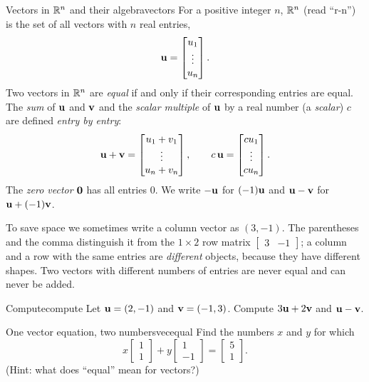 \documentclass[11pt]{article}
\begin{document}
\begin{defn}{Vectors in $\mathbb{R}^n$ and their algebra}{vectors}
For a positive integer $n$, $\mathbb{R}^n$ (read ``r-n'') is the set of all vectors with $n$ real entries,
\[
\mathbf{u}=\begin{bmatrix}u_1\\ \vdots\\ u_n\end{bmatrix}.
\]
Two vectors in $\mathbb{R}^n$ are \emph{equal} if and only if their corresponding entries are equal. The \emph{sum} of
$\mathbf{u}$ and $\mathbf{v}$ and the \emph{scalar multiple} of $\mathbf{u}$ by a real number (a \emph{scalar}) $c$ are defined
\emph{entry by entry}:
\[
\mathbf{u}+\mathbf{v}=\begin{bmatrix}u_1+v_1\\ \vdots\\ u_n+v_n\end{bmatrix},\qquad
c\,\mathbf{u}=\begin{bmatrix}cu_1\\ \vdots\\ cu_n\end{bmatrix}.
\]
The \emph{zero vector} $\mathbf{0}$ has all entries $0$. We write $-\mathbf{u}$ for $(-1)\mathbf{u}$ and
$\mathbf{u}-\mathbf{v}$ for $\mathbf{u}+(-1)\mathbf{v}$.
\end{defn}

To save space we sometimes write a column vector as $(3,-1)$. The parentheses and the comma distinguish it from the
$1\times2$ row matrix $\begin{bmatrix}3&-1\end{bmatrix}$; a column and a row with the same entries are
\emph{different} objects, because they have different shapes. Two vectors with different numbers of entries are never
equal and can never be added.

\begin{kc}{Compute}{compute}
Let $\mathbf{u}=(2,-1)$ and $\mathbf{v}=(-1,3)$. Compute $3\mathbf{u}+2\mathbf{v}$ and $\mathbf{u}-\mathbf{v}$.
\end{kc}

\begin{kc}{One vector equation, two numbers}{vecequal}
Find the numbers $x$ and $y$ for which
\[
x\begin{bmatrix}1\\1\end{bmatrix}+y\begin{bmatrix}1\\-1\end{bmatrix}=\begin{bmatrix}5\\1\end{bmatrix}.
\]
(Hint: what does ``equal'' mean for vectors?)
\end{kc}
\end{document}
